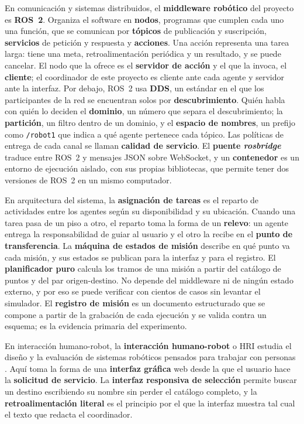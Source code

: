 En comunicación y sistemas distribuidos, el \textbf{middleware robótico} del
proyecto es \textbf{ROS~2}. Organiza el software en \textbf{nodos}, programas que
cumplen cada uno una función, que se comunican por \textbf{tópicos} de
publicación y suscripción, \textbf{servicios} de petición y respuesta y
\textbf{acciones}. Una acción representa una tarea larga: tiene una meta,
retroalimentación periódica y un resultado, y se puede cancelar. El nodo que la
ofrece es el \textbf{servidor de acción} y el que la invoca, el
\textbf{cliente}; el coordinador de este proyecto es cliente ante cada agente y
servidor ante la interfaz. Por debajo, ROS~2 usa \textbf{DDS}, un estándar en el
que los participantes de la red se encuentran solos por \textbf{descubrimiento}.
Quién habla con quién lo deciden el \textbf{dominio}, un número que separa el
descubrimiento; la \textbf{partición}, un filtro dentro de un dominio, y el
\textbf{espacio de nombres}, un prefijo como \texttt{/robot1} que indica a qué
agente pertenece cada tópico. Las políticas de entrega de cada canal se llaman
\textbf{calidad de servicio}. El \textbf{puente \textit{rosbridge}} traduce entre
ROS~2 y mensajes JSON sobre WebSocket, y un \textbf{contenedor} es un entorno de
ejecución aislado, con sus propias bibliotecas, que permite tener dos versiones
de ROS~2 en un mismo computador.

En arquitectura del sistema, la \textbf{asignación de tareas} es el reparto de
actividades entre los agentes según su disponibilidad y su ubicación. Cuando una
tarea pasa de un piso a otro, el reparto toma la forma de un
\textbf{relevo}: un agente entrega la responsabilidad de guiar al usuario y el
otro la recibe en el \textbf{punto de transferencia}. La \textbf{máquina de
estados de misión} describe en qué punto va cada misión, y sus estados se
publican para la interfaz y para el registro. El \textbf{planificador puro}
calcula los tramos de una misión a partir del catálogo de puntos y del par
origen-destino. No depende del middleware ni de ningún estado externo, y por eso
se puede verificar con cientos de casos sin levantar el simulador. El
\textbf{registro de misión} es un documento estructurado que se compone a partir
de la grabación de cada ejecución y se valida contra un esquema; es la evidencia
primaria del experimento.

En interacción humano-robot, la \textbf{interacción humano-robot} o HRI estudia
el diseño y la evaluación de sistemas robóticos pensados para trabajar con
personas \autocite{jimenez2024arquitectura}. Aquí toma la forma de una
\textbf{interfaz gráfica} web desde la que el usuario hace la \textbf{solicitud
de servicio}. La \textbf{interfaz responsiva de selección} permite buscar un
destino escribiendo su nombre sin perder el catálogo completo, y la
\textbf{retroalimentación literal} es el principio por el que la interfaz
muestra tal cual el texto que redacta el coordinador.

